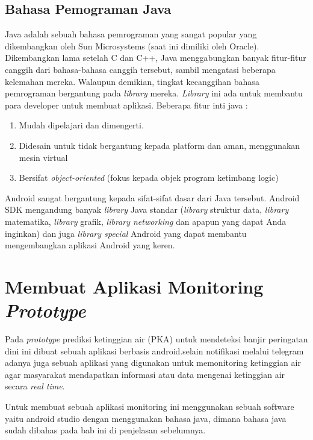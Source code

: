 \subsection{ Bahasa Pemograman Java}
\par Java adalah sebuah bahasa pemrograman yang sangat popular yang dikembangkan oleh Sun Microsystems (saat ini dimiliki oleh Oracle). Dikembangkan lama setelah C dan C++, Java menggabungkan banyak fitur-fitur canggih dari bahasa-bahasa canggih tersebut, sambil mengatasi beberapa kelemahan mereka. Walaupun demikian, tingkat kecanggihan bahasa pemrograman bergantung pada \textit{library} mereka. \textit{Library} ini ada untuk membantu para developer untuk membuat aplikasi. Beberapa fitur inti java :
\begin{enumerate}
    \item Mudah dipelajari dan dimengerti.
    \item Didesain untuk tidak bergantung kepada platform dan aman,     menggunakan mesin virtual
    \item Bersifat\textit{ object-oriented} (fokus kepada objek program ketimbang logic)
\end{enumerate}
\par Android sangat bergantung kepada sifat-sifat dasar dari Java tersebut. Android SDK mengandung banyak \textit{library} Java standar (\textit{library} struktur data, \textit{library} matematika, \textit{library} grafik, \textit{library networking }dan apapun yang dapat Anda inginkan) dan juga\textit{ library special }Android yang dapat membantu mengembangkan aplikasi Android yang keren.



\section{Membuat Aplikasi Monitoring \textit{Prototype}}
\par Pada\textit{ prototype} prediksi ketinggian air (PKA) untuk mendeteksi banjir peringatan dini ini dibuat sebuah aplikasi berbasis android.selain notifikasi melalui telegram adanya juga sebuah aplikasi yang digunakan untuk memonitoring ketinggian air agar masyarakat mendapatkan informasi atau data mengenai ketinggian air secara \textit{real time}. \\
\par Untuk membuat sebuah aplikasi monitoring ini menggunakan sebuah software yaitu android studio dengan menggunakan bahasa java, dimana bahasa java sudah dibahas pada bab ini di penjelasan sebelumnya.

